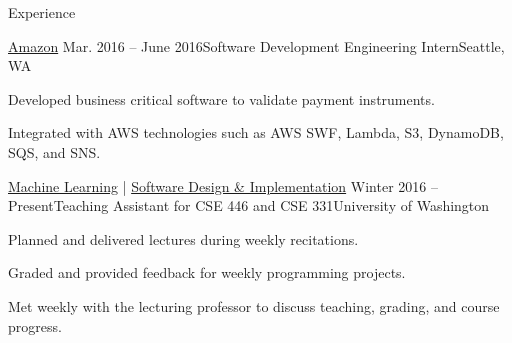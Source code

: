 \documentclass{resume} %
\begin{document}
\begin{rSection}{Experience}
  \begin{rSubsection}{\href{https://www.amazon.com/}{Amazon}}
    {Mar. 2016 -- June 2016}{Software Development Engineering Intern}{Seattle, WA}
  \item Developed business critical software to validate payment instruments.
  \item Integrated with AWS technologies such as AWS SWF, Lambda, S3, DynamoDB, SQS, and SNS.
  \end{rSubsection}
  
  \begin{rSubsection}{\href{https://courses.cs.washington.edu/courses/cse446/17sp/}{Machine Learning} | \href{https://courses.cs.washington.edu/courses/cse331/16wi/}{Software Design \& Implementation}}
    {Winter 2016 -- Present}{Teaching Assistant for CSE 446 and CSE 331}{University of Washington}
  \item Planned and delivered lectures during weekly recitations.
  \item Graded and provided feedback for weekly programming projects.
  \item Met weekly with the lecturing professor to discuss teaching, grading, and course progress.
  \end{rSubsection}
  
\end{rSection}






\end{document}
